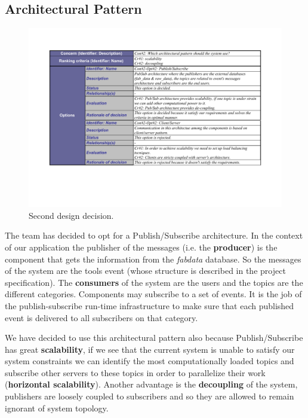 \subsection{Architectural Pattern}
\label{second_design_decision}
 \begin{figure}[H]
\centering
 \includegraphics[trim=1.5cm 3cm 1.5cm 1.3cm,clip=true, width=\textwidth]{dd/dd2.pdf}
\caption{Second design decision.}
\end{figure}
The team has decided to opt for a Publish/Subscribe architecture. 
In the context of our application the publisher of the messages (i.e. the \textbf{producer}) is the component that gets the information from the \textit{fab\textunderscore data} database. So the messages of the system are the tools event (whose structure is described in the project specification). 
The \textbf{consumers} of the system are the users and the topics are the different categories. Components may subscribe to a set of events. It is the job of the publish-subscribe run-time infrastructure to make sure that each published event is delivered to all subscribers on that category.

We have decided to use this architectural pattern also because
Publish/Subscribe has great \textbf{scalability}, if we see that the current system is unable to satisfy our system constraints we can identify the most computationally loaded topics and subscribe other servers to these topics in order to parallelize their work (\textbf{horizontal scalability}). 
Another advantage is the \textbf{decoupling} of the system, publishers are loosely coupled to subscribers and so they are allowed to remain ignorant of system topology.


